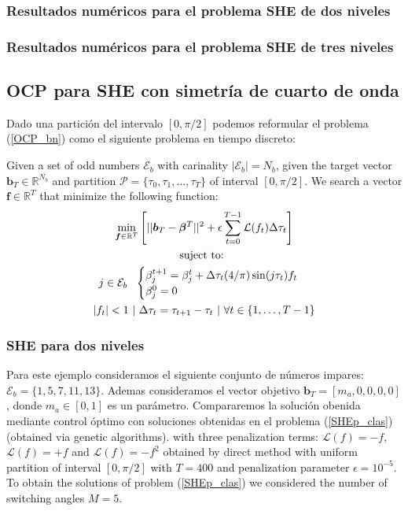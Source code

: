 \subsubsection{Resultados numéricos para el problema SHE de dos niveles}

\subsubsection{Resultados numéricos para el problema SHE de tres niveles}

\subsection{OCP para SHE con simetría de cuarto de onda }

Dado una partición del intervalo $[0,\pi/2]$ podemos reformular el problema (\ref{OCP_bn}) como el siguiente problema en tiempo discreto:

\begin{problem}
    Given  a set of odd numbers $\mathcal{E}_b$ with carinality $|\mathcal{E}_b| = N_b$, given the target vector $\bm{b}_T  \in \mathbb{R}^{N_b}$ and  partition $\mathcal{P} = \{\tau_0,\tau_1,\dots,\tau_{T}\}$ of interval $[0,\pi/2]$. We search a vector $\bm{f} \in \mathbb{R}^{T}$ that minimize the following function:
    \begin{gather}
        \min_{\bm{f} \in \mathbb{R}^{T} } 
        \Bigg[ || \bm{b}_T - \bm{\beta}^{T}||^2 +
         \epsilon  \sum_{t=0}^{T-1} \mathcal{L}(f_{t}) \Delta\tau_t  \Bigg]  \\
        \notag \text{suject to: } \\
        \notag j \in \mathcal{E}_b \ \ 
        \begin{cases}
            \beta_j^{t+1} = \beta_j^{t} + \Delta \tau_t (4/\pi) \sin(j\tau_t) f_t \\
            \beta_j^0 = 0
        \end{cases} \\
        \notag |f_t| < 1 \  | \   \Delta \tau_t = \tau_{t+1} - \tau_{t} \ | \ \forall t \in \{1,\dots,T-1\}
    \end{gather}
\end{problem}


\subsubsection{SHE para dos niveles}

Para este ejemplo consideramos el siguiente conjunto de números impares: $\mathcal{E}_b = \{1,5,7,11,13\}$. Ademas consideramos el vector objetivo $\bm{b}_T = [m_a,0,0,0,0]$, donde  $m_a \in [0,1]$ es un parámetro. Compararemos la solución obenida mediante control óptimo con soluciones obtenidas en el problema (\ref{SHEp_clas}) (obtained via genetic algorithms). with three penalization terms: $\mathcal{L}(f) = -f$, $\mathcal{L}(f) = +f$ and $\mathcal{L}(f) = -f^2$ obtained by direct method with uniform partition of interval $[0,\pi/2]$ with $T=400$ and penalization parameter $\epsilon = 10^{-5}$. To obtain the solutions of problem (\ref{SHEp_clas}) we considered the number of switching angles $M=5$. 

